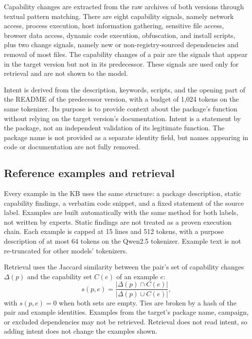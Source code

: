 \documentclass[a4paper,fleqn]{cas-dc}
\begin{document}
Capability changes are extracted from the raw archives of both versions through
textual pattern matching. There are eight capability signals, namely network
access, process execution, host information gathering, sensitive file access,
browser data access, dynamic code execution, obfuscation, and install scripts,
plus two change signals, namely new or non-registry-sourced dependencies and
removal of most files. The capability changes of a pair are the signals that
appear in the target version but not in its predecessor. These signals are used
only for retrieval and are not shown to the model.

Intent is derived from the description, keywords, scripts, and the opening part
of the README of the predecessor version, with a budget of 1,024 tokens on the
same tokenizer. Its purpose is to provide context about the package's function
without relying on the target version's documentation. Intent is a statement by
the package, not an independent validation of its legitimate function. The
package name is not provided as a separate identity field, but names appearing in
code or documentation are not fully removed.

\subsection{Reference examples and retrieval}\label{sec:retrieval}
Every example in the KB uses the same structure: a package description, static
capability findings, a verbatim code snippet, and a fixed statement of the source
label. Examples are built automatically with the same method for both labels,
not written by experts. Static findings are not treated as a proven execution
chain. Each example is capped at 15 lines and 512 tokens, with a purpose
description of at most 64 tokens on the Qwen2.5 tokenizer. Example text is not
re-truncated for other models' tokenizers.

Retrieval uses the Jaccard similarity between the pair's set of capability
changes $\Delta(p)$ and the capability set $C(e)$ of an example $e$:
\begin{equation}
s(p,e) = \frac{|\Delta(p) \cap C(e)|}{|\Delta(p) \cup C(e)|},
\label{eq:jaccard}
\end{equation}
with $s(p,e)=0$ when both sets are empty. Ties are broken by a hash of the pair
and example identities. Examples from the target's package name, campaign, or
excluded dependencies may not be retrieved. Retrieval does not read intent, so
adding intent does not change the examples shown.
\end{document}
